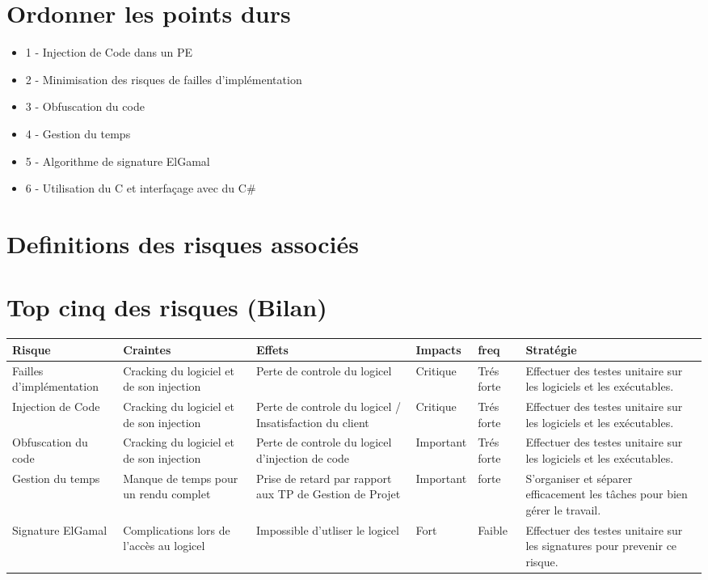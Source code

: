 \chapter{Ordonner les points durs}
\begin{itemize}
	\item 1 - Injection de Code dans un PE
	\item 2 - Minimisation des risques de failles d'implémentation
	\item 3 - Obfuscation du code
	\item 4 - Gestion du temps
	\item 5 - Algorithme de signature ElGamal
	\item 6 - Utilisation du C et interfaçage avec du C# 
\end{itemize}

\chapter{Definitions des risques associés}

\chapter{Top cinq des risques (Bilan)}

\begin{table}[!h]
    \small
    \begin{tabular}{|m{2.5cm}|m{2.5cm}|m{2.5cm}|m{1.5cm}|m{1.5cm}|m{4cm}|} 
	\hline
	\textbf{Risque} & \textbf{Craintes} & \textbf{Effets} & \textbf{Impacts} & \textbf{freq} & \textbf{Stratégie}\\
	\hline
	Failles d'implémentation & Cracking du logiciel et de son injection &  Perte de controle du logicel & Critique & Trés forte & Effectuer des testes unitaire sur les logiciels et les exécutables.\\
	\hline
	Injection de Code & Cracking du logiciel et de son injection &  Perte de controle du logicel / Insatisfaction du client & Critique & Trés forte & Effectuer des testes unitaire sur les logiciels et les exécutables.\\
	\hline
	Obfuscation du code & Cracking du logiciel et de son injection &  Perte de controle du logicel d'injection de code & Important & Trés forte & Effectuer des testes unitaire sur les logiciels et les exécutables.\\
	\hline
	Gestion du temps & Manque de temps pour un rendu complet &  Prise de retard par rapport aux TP de Gestion de Projet & Important & forte & S’organiser et séparer efficacement les tâches pour bien gérer le travail.\\
	\hline
	Signature ElGamal & Complications lors de l'accès au logicel &  Impossible d'utliser le logicel & Fort & Faible & Effectuer des testes unitaire sur les signatures pour prevenir ce risque.\\
	\hline	    
    \end{tabular}
\end{table}

